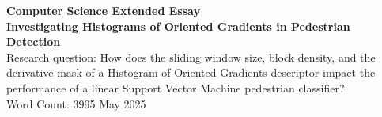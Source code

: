 \documentclass[a4paper, 12pt]{article}
\begin{document}

\begin{titlepage}
    \begin{center}
        \vspace*{1cm}
        \large{\textbf{Computer Science Extended Essay}}\\
        \vspace{3cm}
        \Large{\textbf{Investigating Histograms of Oriented Gradients in Pedestrian Detection}}\\
        \vspace{1.5cm}
        \large{Research question: How does the sliding window size, block density, and the derivative mask of a Histogram of Oriented Gradients descriptor impact the performance of a linear Support Vector Machine pedestrian classifier?}\\
        \vspace{3cm}
        \large{Word Count: 3995}
        \vfill
        \large{May 2025}
    \end{center}
\end{titlepage}




\begin{center}
\begin{spacing}{0.1}
\tableofcontents
\end{spacing}

\vspace{1in}
\end{center}
\newpage
{}











\newpage
\printbibliography[
heading=bibintoc,
]
\newpage

\end{document}
